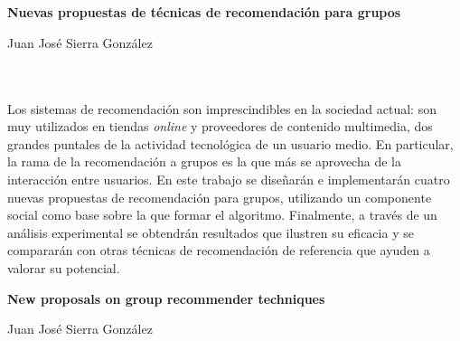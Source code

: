 \chapter*{}






\cleardoublepage
\thispagestyle{empty}

\begin{center}
{\large\bfseries Nuevas propuestas de técnicas de recomendación para grupos}\\
\end{center}
\begin{center}
Juan José Sierra González\\
\end{center}

\\

\vspace{0.7cm}
\\

Los sistemas de recomendación son imprescindibles en la sociedad actual: son muy utilizados en tiendas \textit{online} y proveedores de contenido multimedia, dos grandes puntales de la actividad tecnológica de un usuario medio. En particular, la rama de la recomendación a grupos es la que más se aprovecha de la interacción entre usuarios. En este trabajo se diseñarán e implementarán cuatro nuevas propuestas de recomendación para grupos, utilizando un componente social como base sobre la que formar el algoritmo. Finalmente, a través de un análisis experimental se obtendrán resultados que ilustren su eficacia y se compararán con otras técnicas de recomendación de referencia que ayuden a valorar su potencial.
\cleardoublepage


\thispagestyle{empty}


\begin{center}
{\large\bfseries New proposals on group recommender techniques}\\
\end{center}
\begin{center}
Juan José Sierra González\\
\end{center}

